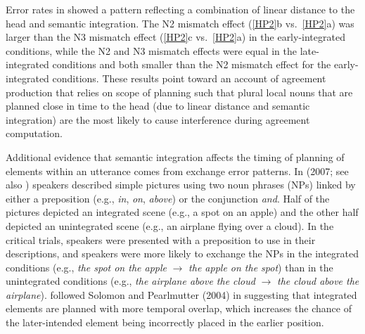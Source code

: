 \documentclass[12pt,titlepage]{article}
\newcommand{\IGNORE}[1]{} %
\begin{document}
Error rates in  showed a pattern reflecting a combination of linear distance to the head and semantic integration.  The N2 mismatch effect (\ref{HP2}b vs.~\ref{HP2}a) was larger than the N3 mismatch effect (\ref{HP2}c vs.~\ref{HP2}a) in the early-integrated conditions, while the N2 and N3 mismatch effects were equal in the late-integrated conditions and both smaller than the N2 mismatch effect for the early-integrated conditions. \IGNORE{These results suggest that structural relations are not necessary to explain mismatch effects within complex subject NPs with phrasal modifiers. }These results point toward an account of agreement production that relies on scope of planning such that plural local nouns that are planned close in time to the head (due to linear distance and semantic integration) are the most likely to cause interference during agreement computation.


Additional evidence that semantic integration affects the timing of planning of elements within an utterance comes from exchange error patterns. In \citeauthor{PearlmutterSolomonCUNY07} (2007; see also ) speakers described simple pictures using two noun phrases (NPs) linked by either a preposition (e.g., \textit{in}, \textit{on}, \textit{above}) or the conjunction \textit{and}.  Half of the pictures depicted an integrated scene (e.g., a spot on an apple) and the other half depicted an unintegrated scene (e.g., an airplane flying over a cloud). In the critical trials, speakers were presented with a preposition to use in their descriptions, and speakers were more likely to exchange the NPs in the integrated conditions (e.g., \textit{the spot on the apple} $\rightarrow$ \textit{the apple on the spot}) than in the unintegrated conditions (e.g., \textit{the airplane above the cloud} $\rightarrow$ \textit{the cloud above the airplane}). \citeauthor{PearlmutterSolomonCUNY07} followed Solomon and Pearlmutter (2004) in suggesting that integrated elements are planned with more temporal overlap, which increases the chance of the later-intended element being incorrectly placed in the earlier position.
\end{document}
